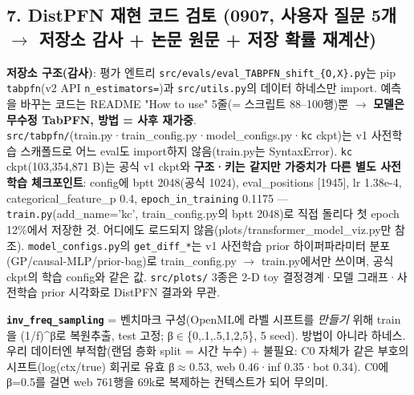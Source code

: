 \subsection{7. DistPFN 재현 코드 검토 (0907, 사용자 질문 5개  \ensuremath{\rightarrow}  저장소 감사 +\allowbreak{} 논문 원문 +\allowbreak{} 저장 확률 재계산)}
\par\noindent \textbullet\enspace \textbf{저장소 구조(감사)}: 평가 엔트리 \texttt{src/\allowbreak{}\allowbreak{}eval\allowbreak{}s/\allowbreak{}\allowbreak{}eval\_\allowbreak{}\allowbreak{}T\allowbreak{}ABPFN\_\allowbreak{}\allowbreak{}sh\allowbreak{}ift\_\allowbreak{}\allowbreak{}\{\allowbreak{}O,\allowbreak{}X\allowbreak{}\}\allowbreak{}.\allowbreak{}py}는 pip \texttt{tabpfn}(v2 API \texttt{n\_\allowbreak{}\allowbreak{}estima\allowbreak{}tors=\allowbreak{}\allowbreak{}})과 \texttt{src/\allowbreak{}\allowbreak{}util\allowbreak{}s.\allowbreak{}py}의 데이터 하네스만 import. 예측을 바꾸는 코드는 README "How to use" 5줄(=\allowbreak{} 스크립트 88–100행)뿐  \ensuremath{\rightarrow}  \textbf{모델은 무수정 TabPFN, 방법 =\allowbreak{} 사후 재가중}. \texttt{src/\allowbreak{}\allowbreak{}tabp\allowbreak{}fn/\allowbreak{}\allowbreak{}}(train.py·train\_\allowbreak{}config.py·model\_\allowbreak{}configs.py·\texttt{kc} ckpt)는 v1 사전학습 스캐폴드로 어느 eval도 import하지 않음(train.py는 SyntaxError). \texttt{kc} ckpt(103,354,871 B)는 공식 v1 ckpt와 \textbf{구조·키는 같지만 가중치가 다른 별도 사전학습 체크포인트}: config에 bptt 2048(공식 1024), eval\_\allowbreak{}positions [1945], lr 1.38e-4, categorical\_\allowbreak{}feature\_\allowbreak{}p 0.4, \texttt{epoch\_\allowbreak{}\allowbreak{}in\allowbreak{}\_\allowbreak{}\allowbreak{}trainin\allowbreak{}g} 0.1175 — \texttt{train.\allowbreak{}py\allowbreak{}}(add\_\allowbreak{}name=\allowbreak{}'kc', train\_\allowbreak{}config.py의 bptt 2048)로 직접 돌리다 첫 epoch 12\%에서 저장한 것. 어디에도 로드되지 않음(plots/\allowbreak{}transformer\_\allowbreak{}model\_\allowbreak{}viz.py만 참조). \texttt{model\_\allowbreak{}\allowbreak{}co\allowbreak{}nfigs.\allowbreak{}py\allowbreak{}}의 \texttt{get\_\allowbreak{}\allowbreak{}diff\allowbreak{}\_\allowbreak{}\allowbreak{}*}는 v1 사전학습 prior 하이퍼파라미터 분포(GP/\allowbreak{}causal-MLP/\allowbreak{}prior-bag)로 train\_\allowbreak{}config.py \ensuremath{\rightarrow} train.py에서만 쓰이며, 공식 ckpt의 학습 config와 같은 값. \texttt{src/\allowbreak{}\allowbreak{}plot\allowbreak{}s/\allowbreak{}\allowbreak{}} 3종은 2-D toy 결정경계·모델 그래프·사전학습 prior 시각화로 DistPFN 결과와 무관.


\par\noindent \textbullet\enspace \textbf{\texttt{inv\_\allowbreak{}\allowbreak{}freq\allowbreak{}\_\allowbreak{}\allowbreak{}samplin\allowbreak{}g}} =\allowbreak{} 벤치마크 구성(OpenML에 라벨 시프트를 \emph{만들기} 위해 train을 (1/\allowbreak{}f)\textasciicircum{}β로 복원추출, test 고정; β\ensuremath{\in}\{0,.1,.5,1,2,5\}, 5 seed). 방법이 아니라 하네스. 우리 데이터엔 부적합(랜덤 층화 split =\allowbreak{} 시간 누수) +\allowbreak{} 불필요: C0 자체가 같은 부호의 시프트(log(ctx/\allowbreak{}true) 회귀로 유효 β\ensuremath{\approx}0.53, web 0.46·inf 0.35·bot 0.34). C0에 β=\allowbreak{}0.5를 걸면 web 761행을 69k로 복제하는 컨텍스트가 되어 무의미.


